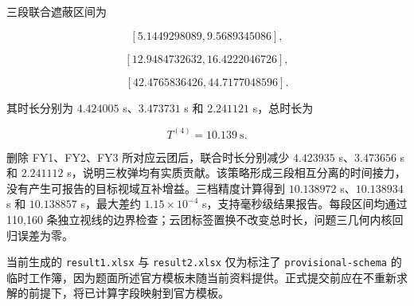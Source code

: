 \begin{landscape}
\begin{center}
\scriptsize
\setlength{\tabcolsep}{3pt}
\renewcommand{\arraystretch}{1.18}
\end{center}
\end{landscape}

三段联合遮蔽区间为

\[
[5.1449298089,9.5689345086],
\]

\[
[12.9484732632,16.4222046726],
\]

\[
[42.4765836426,44.7177048596].
\]

其时长分别为 $4.424005$ s、$3.473731$ s 和 $2.241121$ s，总时长为

\[
\boxed{T^{(4)}=10.139\ \mathrm s}.
\]

删除 FY1、FY2、FY3 所对应云团后，联合时长分别减少 $4.423935$ s、$3.473656$ s 和 $2.241112$ s，说明三枚弹均有实质贡献。该策略形成三段相互分离的时间接力，没有产生可报告的目标视域互补增益。三档精度计算得到 $10.138972$ s、$10.138934$ s 和 $10.138857$ s，最大差约 $1.15\times10^{-4}$ s，支持毫秒级结果报告。每段区间均通过 110,160 条独立视线的边界检查；云团标签置换不改变总时长，问题三几何内核回归误差为零。

当前生成的 \nolinkurl{result1.xlsx} 与 \nolinkurl{result2.xlsx} 仅为标注了 \nolinkurl{provisional-schema} 的临时工作簿，因为题面所述官方模板未随当前资料提供。正式提交前应在不重新求解的前提下，将已计算字段映射到官方模板。

